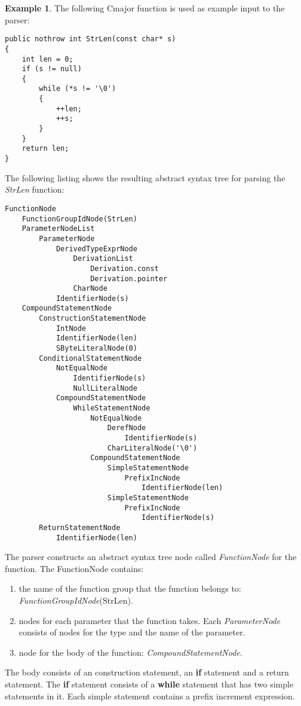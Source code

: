 \documentclass[a4paper,oneside,11pt]{book}
\theoremstyle{definition}
\newtheorem{exmp}{Example}[section]
\begin{document}
\begin{exmp}
The following Cmajor function is used as example input to the parser:

\lstset{language=Cmajor}
\begin{lstlisting}
public nothrow int StrLen(const char* s)
{
    int len = 0;
    if (s != null)
    {
        while (*s != '\0')
        {
            ++len;
            ++s;
        }
    }
    return len;
}
\end{lstlisting}

The following listing shows the resulting abstract syntax tree for parsing the \emph{StrLen} function:

\begin{verbatim}
FunctionNode
    FunctionGroupIdNode(StrLen)
    ParameterNodeList
        ParameterNode
            DerivedTypeExprNode
                DerivationList
                    Derivation.const
                    Derivation.pointer
                CharNode
            IdentifierNode(s)
    CompoundStatementNode
        ConstructionStatementNode
            IntNode
            IdentifierNode(len)
            SByteLiteralNode(0)
        ConditionalStatementNode
            NotEqualNode
                IdentifierNode(s)
                NullLiteralNode
            CompoundStatementNode
                WhileStatementNode
                    NotEqualNode
                        DerefNode
                            IdentifierNode(s)
                        CharLiteralNode('\0')
                    CompoundStatementNode
                        SimpleStatementNode
                            PrefixIncNode
                                IdentifierNode(len)
                        SimpleStatementNode
                            PrefixIncNode
                                IdentifierNode(s)
        ReturnStatementNode
            IdentifierNode(len)
\end{verbatim}

The parser constructs an abstract syntax tree node called \emph{FunctionNode} for the function.
The FunctionNode contains:
\begin{enumerate}
\item
the name of the function group that the function belongs to: \emph{FunctionGroupIdNode}(StrLen).
\item
nodes for each parameter that the function takes.
Each \emph{ParameterNode} consists of nodes for the type and the name of the parameter.
\item
node for the body of the function: \emph{CompoundStatementNode}.
\end{enumerate}

The body consists of an construction statement, an \textbf{if} statement
and a return statement. The \textbf{if} statement consists of a
\textbf{while} statement that has two simple statements in it.
Each simple statement contains a prefix increment expression.
\end{exmp}
\end{document}

